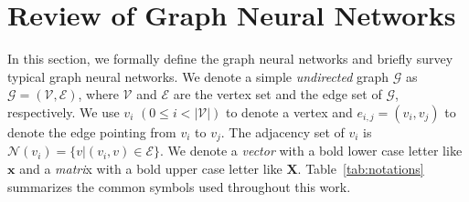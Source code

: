 \section{Review of Graph Neural Networks}
\label{sec:review_of_gnns}

In this section, we formally define the graph neural networks and briefly survey typical graph neural networks.
We denote a simple \emph{undirected} graph $\mathcal{G}$ as $\mathcal{G}=(\mathcal{V}, \mathcal{E})$, where $\mathcal{V}$ and $\mathcal{E}$ are the vertex set and the edge set of $\mathcal{G}$, respectively.
We use $v_i$ $(0 \leq i < |\mathcal{V}|)$ to denote a vertex and $e_{i,j}=(v_i, v_j)$ to denote the edge pointing from $v_i$ to $v_j$.
The adjacency set of $v_i$ is $\mathcal{N}(v_i)=\{v|(v_i, v) \in \mathcal{E}\}$.
We denote a \emph{vector} with a bold lower case letter like $\boldsymbol{x}$ and a \emph{matri}x with a bold upper case letter like $\boldsymbol{X}$.
Table~\ref{tab:notations} summarizes the common symbols used throughout this work.


